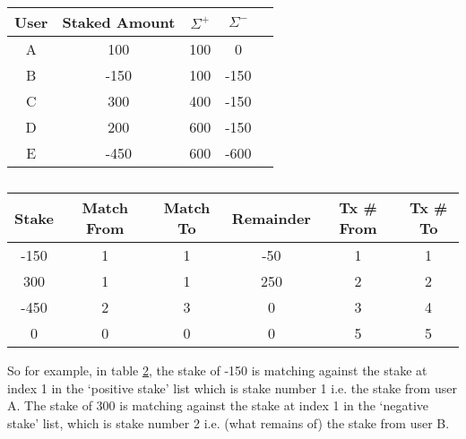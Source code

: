 \begin{table}[ht]
\centering
\caption{}
\label{appa:modifiedexample}
\begin{tabular}{|c|c|c|c|c|}
\hline
User  & Staked Amount & $\Sigma^+$ & $\Sigma^-$ \\ \hline
A & 100           & 100                      & 0                                                                       \\ \hline
B & -150           & 100                      & -150                                                                     \\ \hline
C & 300           & 400                      & -150                                                                       \\ \hline
D & 200          & 600                      & -150                                                                    \\ \hline
E & -450          & 600                      & -600                                                                    \\ \hline
\end{tabular}
\end{table}

\begin{table}[ht]
\centering
\caption{}
\label{appa:modifiedexamplelog}
\begin{tabular}{|c|c|c|c|c|c|}
\hline
Stake & Match From & Match To & Remainder & Tx \# From & Tx \# To\\ \hline
-150  & 1          & 1        & -50      & 1 & 1 \\ \hline
300   & 1          & 1        & 250      & 2 & 2 \\ \hline
-450  & 2          & 3        & 0       &  3 & 4 \\ \hline
0  & 0         & 0        & 0 & 5 & 5            \\ \hline
\end{tabular}

\end{table}

So for example, in table \ref{appa:modifiedexamplelog}, the stake of -150 is matching against the stake at index 1 in the `positive stake' list which is stake number 1 i.e. the stake from user A. The stake of 300 is matching against the stake at index 1 in the `negative stake' list, which is stake number 2 i.e. (what remains of) the stake from user B.